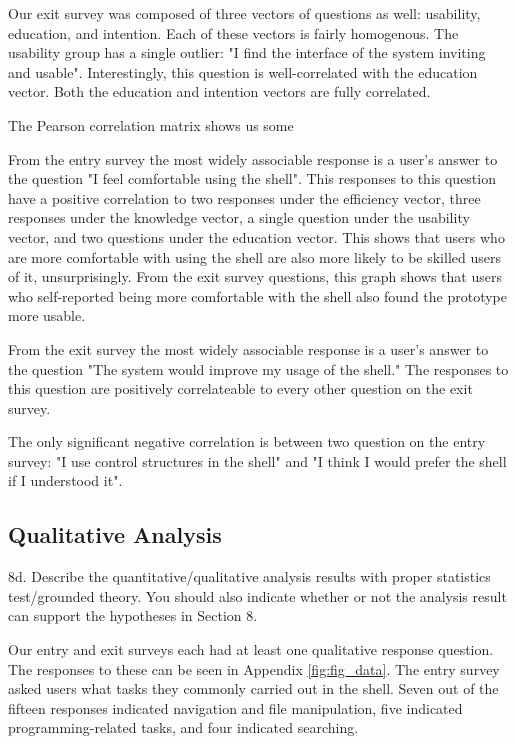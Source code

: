 Our exit survey was composed of three vectors of questions as well: usability,
education, and intention. Each of these vectors is fairly homogenous. The
usability group has a single outlier: "I find the interface of the system
inviting and usable". Interestingly, this question is well-correlated with the
education vector. Both the education and intention vectors are fully correlated.

The Pearson correlation matrix shows us some 

From the entry survey the most widely associable response is a user's answer to
the question "I feel comfortable using the shell". This responses to this
question have a positive correlation to two responses under the efficiency
vector, three responses under the knowledge vector, a single question under the
usability vector, and two questions under the education vector. This shows that
users who are more comfortable with using the shell are also more likely to be
skilled users of it, unsurprisingly. From the exit survey questions, this graph
shows that users who self-reported being more comfortable with the shell also
found the prototype more usable.

From the exit survey the most widely associable response is a user's answer to
the question "The system would improve my usage of the shell." The responses to
this question are positively correlateable to every other question on the exit
survey.

The only significant negative correlation is between two question on the entry
survey: "I use control structures in the shell" and "I think I would prefer the
shell if I understood it".

\subsection{Qualitative Analysis}
    8d. Describe the quantitative/qualitative analysis results with proper
    statistics test/grounded theory. You should also indicate whether or not the
    analysis result can support the hypotheses in Section 8.

Our entry and exit surveys each had at least one qualitative response question.
The responses to these can be seen in Appendix \ref{fig:fig_data}.
The entry survey asked users what tasks they commonly carried out in the shell.
Seven out of the fifteen responses indicated navigation and file manipulation,
five indicated programming-related tasks, and four indicated searching.

